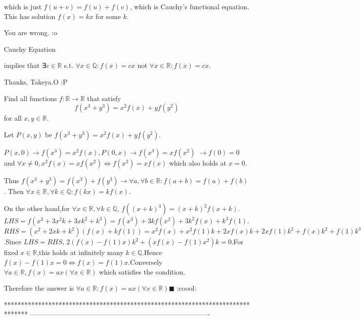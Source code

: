 \begin{mysolution}
	\begin{tcolorbox}
which is just $ f(u+v) = f(u)+f(v)$, which is Cauchy's functional equation. This has solution $ f(x)=kx$ for some $ k$.\end{tcolorbox}

You are wrong. :o

\begin{bolded}Cauchy Equation\end{bolded} implies that ∃$c\in \mathbb R$ s.t. $\forall x\in \mathbb Q:f(x)=cx$ not $\forall x\in \mathbb R:f(x)=cx$.

Thanks,
Takeya.O :P


\end{mysolution}



\begin{mysolution}
	\begin{tcolorbox}Find all functions $ f : \mathbb{R}\to\mathbb{R}$ that satisfy
\[ f (x^{3} + y^{3}) = x^{2}f (x) + yf (y^{2})
\]
for all $ x, y \in\mathbb R.$\end{tcolorbox}

Let $P(x,y)$ be $f(x^3+y^3)=x^2f(x)+yf(y^2)$.

$P(x,0)\rightarrow f(x^3)=x^2f(x),
P(0,x)\rightarrow f(x^3)=xf(x^2)$
$\rightarrow f(0)=0$ and $\forall x\neq 0,x^2f(x)=xf(x^2)\Leftrightarrow f(x^2)=xf(x)$ which also holds at $x=0$.

Thus
$f(x^3+y^3)=f(x^3)+f(y^3)\rightarrow
\forall a,\forall b\in \mathbb R:f(a+b)=f(a)+f(b)$.
Then $\forall x\in \mathbb R,\forall k\in \mathbb Q:f(kx)=kf(x)$.

On the other hand,for $\forall x\in \mathbb R,\forall k\in \mathbb Q$,
$f((x+k)^3)=(x+k)^2f(x+k)$.$LHS=f(x^3+3x^2k+3xk^2+k^3)=f(x^3)+3kf(x^2)+3k^2f(x)+k^3f(1)$.$RHS=(x^2+2xk+k^2)(f(x)+kf(1))=x^2f(x)+x^2f(1)k+2xf(x)k+2xf(1)k^2+f(x)k^2+f(1)k^3$.Since $LHS=RHS$,
$2(f(x)-f(1)x)k^2+(xf(x)-f(1)x^2)k=0$.For fixed $x\in \mathbb R$,this holds at infinitely many $k\in \mathbb Q$.Hence $f(x)-f(1)x=0\Leftrightarrow f(x)=f(1)x$.Conversely $\forall a\in \mathbb R,f(x)=ax(\forall x\in \mathbb R)$ which satisfies the condition.

Therefore the answer is
$\boxed{\forall a\in \mathbb R:f(x)=ax(\forall x\in \mathbb R)}\blacksquare$ :coool: 
\end{mysolution}
*******************************************************************************
-------------------------------------------------------------------------------

